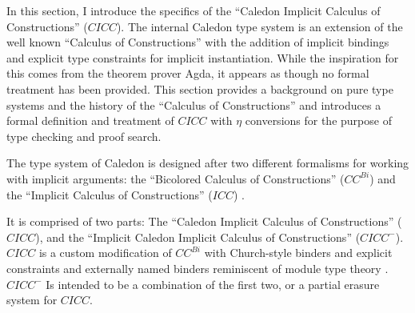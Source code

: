 In this section, I introduce the specifics of the ``Caledon Implicit Calculus of Constructions'' ($CICC$).
The internal Caledon type system is an extension of the well known ``Calculus of Constructions'' with the 
addition of implicit bindings and explicit type constraints for implicit instantiation.  
While the inspiration for this comes from the theorem prover Agda, 
it appears as though no formal treatment
has been provided. This section provides a background on pure type systems 
and the history of the ``Calculus of Constructions''
and introduces a formal definition and treatment of $CICC$ with 
$\eta$ conversions for the purpose of type checking
and proof search.

The type system of Caledon is designed after two different formalisms for working with implicit arguments:  
the ``Bicolored Calculus of Constructions'' ($CC^{Bi}$) \citep{luther2001more} and 
the ``Implicit Calculus of Constructions'' ($ICC$) \citep{miquel2001implicit}.

It is comprised of two parts: The ``Caledon Implicit Calculus of Constructions'' ($CICC$), 
and the ``Implicit Caledon Implicit Calculus of Constructions'' ($CICC^-$). 
$CICC$ is a custom modification of $CC^{Bi}$ with Church-style binders and explicit constraints and 
externally named binders
reminiscent of module type theory \citep{dreyer2003type}.
$CICC^-$ Is intended to be a combination of the first two, or a partial 
erasure system for $CICC$. 
